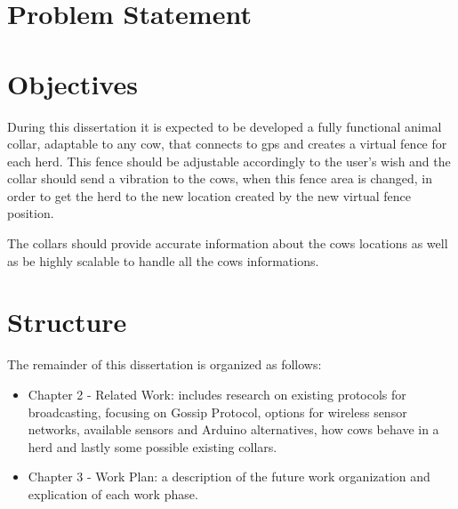 \section{Problem Statement}
\label{sec:problem_statement}

\section{Objectives}
\label{sec:objectives}
\hspace{5mm} During this dissertation it is expected to be developed a fully
functional animal collar, adaptable to any cow, that connects to gps and creates a
virtual fence for each herd. This fence should be adjustable accordingly to the
user's wish and the collar should send a vibration to the cows, when this fence
area is changed, in order to get the herd to the new location created by the new
virtual fence position.

The collars should provide accurate information about the cows locations as well
as be highly scalable to handle all the cows informations.

\section{Structure}
\label{sec:structure}
\hspace{5mm} The remainder of this dissertation is organized as follows:
\begin{itemize}
    \item Chapter 2 - Related Work: includes research on existing protocols for
          broadcasting, focusing on Gossip Protocol, options for wireless sensor networks,
          available sensors and Arduino alternatives, how cows behave in a herd and lastly
          some possible existing collars.
    \item Chapter 3 - Work Plan: a description of the future work organization and
          explication of each work phase.
\end{itemize}
